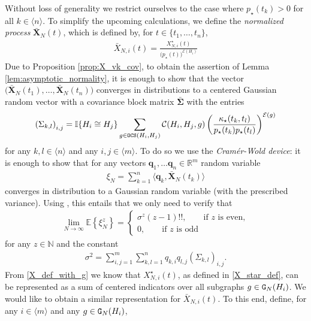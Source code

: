 \documentclass[11pt,reqno]{amsart}
\numberwithin{equation}{section}
\newcommand{\sprod}[1]{\langle#1\rangle}
\newcommand{\E}[1]{\mathbb{E}\left\{ #1\right\}}
\newcommand{\R}{\mathbb{R}}
\newcommand{\N}{\mathbb{N}}
\newcommand{\nelem}[1]{{Lemma \ref{#1}}}
\newcommand{\neprop}[1]{{Proposition \ref{#1}}}
\newcommand{\kb}[1]{\boldsymbol{#1}}
\newcommand{\vk}[1]{\kb{#1}}
\begin{document}
Without loss of generality we restrict ourselves to the case where $p_{\star}(t_k)>0$ for all $k\in\sprod{n}$.
{To simplify the upcoming calculations, we define the} {\it normalized process} $\bar{\vk X}_N(t)$, which is defined by, for $t\in\{t_1,\ldots,t_n\}$,
\begin{align*}
    \bar{X}_{N,i}(t) = \frac{X^{\star}_{N,i}(t)}{\bigl(p_{\star}(t)\bigr)^{\mathcal{E}({H}_i)}}
\end{align*}
{Due to \neprop{prop:X_vk_cov}, to} obtain the assertion of \nelem{lem:asymptotic_normality}, it is enough to show that the vector $\bigl(\bar{\vk X}_N(t_1),\ldots,\bar{\vk X}_{N}(t_n)\bigr)$ converges in distributions to a centered Gaussian random vector with a covariance block matrix $\bar{\vk \Sigma}$ with the entries
\begin{align}
\left(\Sigma_{k,l}\right)_{i,j} = \mathbb{I}\{{H}_i\cong {H}_j\}\sum_{g\in{\tt OCS}({H}_i,{H}_j)}\mathcal{C}({H}_i,{H}_j,g)\left(\frac{\kappa_{\star}(t_k,t_l)}{p_{\star}(t_k)p_{\star}(t_l)}\right)^{\mathcal{E}(g)}\label{sigma_klij_def}
\end{align}
for any $k,l\in\sprod{n}$ and any $i,j\in\sprod{m}$.
{To do so} we use the {\it Cram\'er-Wold device}: it is enough to show that for any vectors $\vk q_1,\ldots \vk q_n\in\R^m$ random variable
\begin{align}
    {\xi_N} = \sum_{k=1}^{n}\sprod{\vk q_k, \bar{\vk X}_N(t_k)}\label{xi_init_def}
\end{align}
converges in distribution to a Gaussian random variable (with the prescribed variance). 
Using \cite[Theorem 30.2]{billingsley2017probability}, this entails that we only need to verify that
\begin{align}
    \lim_{N\to\infty}\E{\xi_{{N}}^z} = \begin{cases} \sigma^z(z-1)!!,\qquad \text{if $z$ is even},\\
    0,\qquad \text{if $z$ is odd}
    \end{cases}\label{normality_claim}
\end{align}
for any  $z\in\N$ and the constant 
\begin{align}
    \sigma^2 = \sum_{i,j=1}^{m}\sum_{k,l=1}^{n}q_{k,i}q_{l,j}\left(\Sigma_{k,l}\right)_{i,j}.\label{sigma_def}
\end{align}
From \eqref{X_def_with_g} we know that $X_{N,i}^{\star}(t)$, as {defined in \eqref{X_star_def}}, can be represented as a sum of centered indicators over all subgraphs $g\in{\tt G}_N({H}_i)$. We would like to {obtain} a similar {representation} for $\bar{X}_{N,i}(t)$.  To this end, define, for any $i\in\sprod{m}$ and any $g\in{\tt G}_{N}({H}_i)$,
\end{document}
